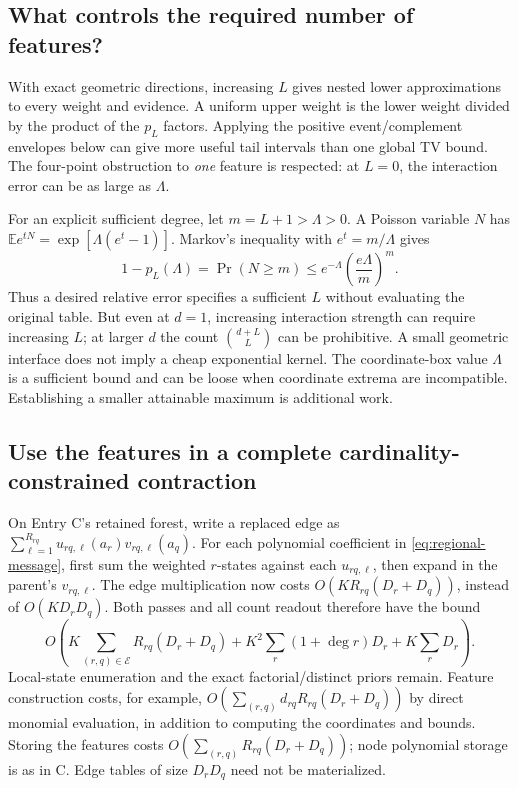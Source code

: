 \documentclass[10pt,a4paper]{article}
\newcommand{\E}{\mathbb E}
\begin{document}
\subsection{What controls the required number of features?}
With exact geometric directions, increasing $L$ gives nested lower approximations to every weight and
evidence. A uniform upper weight is the lower weight divided by the product of the $p_L$ factors. Applying
the positive event/complement envelopes below can give more useful tail intervals than one global TV bound.
The four-point obstruction to \emph{one} feature is respected: at $L=0$, the interaction error can be as
large as $\Lambda$.

For an explicit sufficient degree, let $m=L+1>\Lambda>0$. A Poisson variable $N$ has
$\E e^{tN}=\exp[\Lambda(e^t-1)]$. Markov's inequality with $e^t=m/\Lambda$ gives
\[
 1-p_L(\Lambda)=\Pr(N\geq m)
 \leq e^{-\Lambda}\left(\frac{e\Lambda}{m}\right)^m.
\]
Thus a desired relative error specifies a sufficient $L$ without evaluating the original table. But even
at $d=1$, increasing interaction strength can require increasing $L$; at larger $d$ the count
$\binom{d+L}{L}$ can be prohibitive. A small geometric interface does not imply a cheap exponential kernel.
The coordinate-box value $\Lambda$ is a sufficient bound and can be loose when coordinate extrema are
incompatible. Establishing a smaller attainable maximum is additional work.

\subsection{Use the features in a complete cardinality-constrained contraction}
On Entry C's retained forest, write a replaced edge as
$\sum_{\ell=1}^{R_{rq}}u_{rq,\ell}(a_r)v_{rq,\ell}(a_q)$.
For each polynomial coefficient in \eqref{eq:regional-message}, first sum the weighted $r$-states against
each $u_{rq,\ell}$, then expand in the parent's $v_{rq,\ell}$. The edge multiplication now costs
$O(KR_{rq}(D_r+D_q))$, instead of $O(KD_rD_q)$. Both passes and all count readout therefore have the bound
\begin{equation}
 O\!\left(K\sum_{(r,q)\in\mathcal E}R_{rq}(D_r+D_q)
       +K^2\sum_r(1+\deg r)D_r+K\sum_rD_r\right).
 \label{eq:feature-cost}
\end{equation}
Local-state enumeration and the exact factorial/distinct priors remain. Feature construction costs, for
example, $O(\sum_{(r,q)}d_{rq}R_{rq}(D_r+D_q))$ by direct monomial evaluation, in addition to computing the
coordinates and bounds. Storing the features costs $O(\sum_{(r,q)}R_{rq}(D_r+D_q))$; node polynomial
storage is as in C. Edge tables of size $D_rD_q$ need not be materialized.
\end{document}
